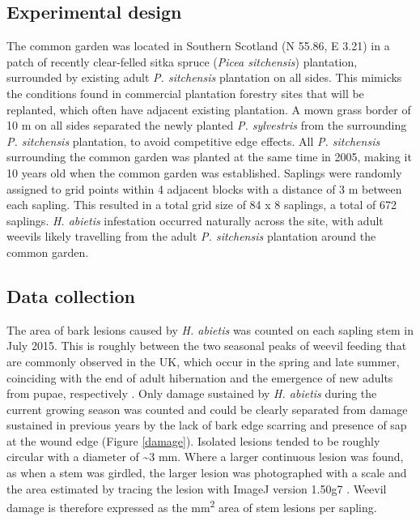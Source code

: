 \documentclass[a4paper, 11pt]{article}
\newcommand{\todo}[1]{\textcolor{red}{#1}}   %
\begin{document}
\subsection*{Experimental design}

The common garden was located in Southern Scotland (N 55.86\textdegree{}, E \textminus{}3.21\textdegree{}) in a patch of recently clear-felled sitka spruce (\textit{Picea sitchensis}) plantation, surrounded by existing adult \textit{P. sitchensis} plantation on all sides. This mimicks the conditions found in commercial plantation forestry sites that will be replanted, which often have adjacent existing plantation. A mown grass border of 10 m on all sides separated the newly planted \textit{P. sylvestris} from the surrounding \textit{P. sitchensis} plantation, to avoid competitive edge effects. All \textit{P. sitchensis} surrounding the common garden was planted at the same time in 2005, making it 10 years old when the common garden was established. %
Saplings were randomly assigned to grid points within 4 adjacent blocks with a distance of 3 m between each sapling. This resulted in a total grid size of 84 x 8 saplings, a total of 672 saplings. \textit{H. abietis} infestation occurred naturally across the site, with adult weevils likely travelling from the adult \textit{P. sitchensis} plantation around the common garden. 

\subsection*{Data collection}

The area of bark lesions caused by \textit{H. abietis} was counted on each sapling stem in July 2015. This is roughly between the two seasonal peaks of weevil feeding that are commonly observed in the UK, which occur in the spring and late summer, coinciding with the end of adult hibernation and the emergence of new adults from pupae, respectively \citep{Nordenhem1989, Leather1999}. Only damage sustained by \textit{H. abietis} during the current growing season was counted and could be clearly separated from damage sustained in previous years by the lack of bark edge scarring and presence of sap at the wound edge (Figure \ref{damage}). Isolated lesions tended to be roughly circular with a diameter of \textasciitilde{}3 mm. Where a larger continuous lesion was found, as when a stem was girdled, the larger lesion was photographed with a scale and the area estimated by tracing the lesion with ImageJ version 1.50g7 \citep{Schneider2012}. Weevil damage is therefore expressed as the mm\textsuperscript{2} area of stem lesions per sapling. 
\end{document}
